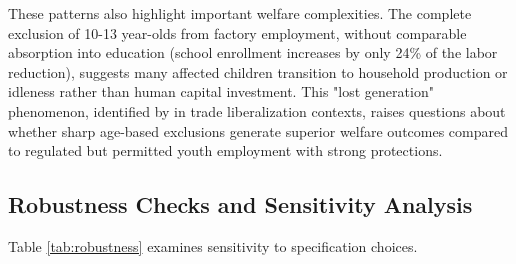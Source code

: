 \documentclass[12pt]{article}
\begin{document}
These patterns also highlight important welfare complexities. The complete exclusion of 10-13 year-olds from factory employment, without comparable absorption into education (school enrollment increases by only 24\% of the labor reduction), suggests many affected children transition to household production or idleness rather than human capital investment. This "lost generation" phenomenon, identified by \cite{edmonds2005effect} in trade liberalization contexts, raises questions about whether sharp age-based exclusions generate superior welfare outcomes compared to regulated but permitted youth employment with strong protections.





\subsection{Robustness Checks and Sensitivity Analysis}

Table \ref{tab:robustness} examines sensitivity to specification choices.
\end{document}
